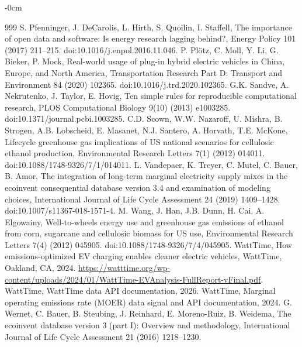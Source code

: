 \documentclass[cleantechnol,article,submit,pdftex,moreauthors]{Definitions/mdpi}
\begin{document}
\begin{adjustwidth}{-\extralength}{0cm}
\begin{thebibliography}{999}
S. Pfenninger, J. DeCarolis, L. Hirth, S. Quoilin, I. Staffell, The importance of open data and software: Is energy research lagging behind?, Energy Policy 101 (2017) 211--215. doi:10.1016/j.enpol.2016.11.046.
P. Plötz, C. Moll, Y. Li, G. Bieker, P. Mock, Real-world usage of plug-in hybrid electric vehicles in China, Europe, and North America, Transportation Research Part D: Transport and Environment 84 (2020) 102365. doi:10.1016/j.trd.2020.102365.
G.K. Sandve, A. Nekrutenko, J. Taylor, E. Hovig, Ten simple rules for reproducible computational research, PLOS Computational Biology 9(10) (2013) e1003285. doi:10.1371/journal.pcbi.1003285.
C.D. Scown, W.W. Nazaroff, U. Mishra, B. Strogen, A.B. Lobscheid, E. Masanet, N.J. Santero, A. Horvath, T.E. McKone, Lifecycle greenhouse gas implications of US national scenarios for cellulosic ethanol production, Environmental Research Letters 7(1) (2012) 014011. doi:10.1088/1748-9326/7/1/014011.
L. Vandepaer, K. Treyer, C. Mutel, C. Bauer, B. Amor, The integration of long-term marginal electricity supply mixes in the ecoinvent consequential database version 3.4 and examination of modeling choices, International Journal of Life Cycle Assessment 24 (2019) 1409--1428. doi:10.1007/s11367-018-1571-4.
M. Wang, J. Han, J.B. Dunn, H. Cai, A. Elgowainy, Well-to-wheels energy use and greenhouse gas emissions of ethanol from corn, sugarcane and cellulosic biomass for US use, Environmental Research Letters 7(4) (2012) 045905. doi:10.1088/1748-9326/7/4/045905.
WattTime, How emissions-optimized EV charging enables cleaner electric vehicles, WattTime, Oakland, CA, 2024. \url{https://watttime.org/wp-content/uploads/2024/01/WattTime-EVAnalysis-FullReport-vFinal.pdf}.
WattTime, WattTime data API documentation, 2026.
WattTime, Marginal operating emissions rate (MOER) data signal and API documentation, 2024.
G. Wernet, C. Bauer, B. Steubing, J. Reinhard, E. Moreno-Ruiz, B. Weidema, The ecoinvent database version 3 (part I): Overview and methodology, International Journal of Life Cycle Assessment 21 (2016) 1218--1230.
\end{thebibliography}

\PublishersNote{}
\end{adjustwidth}
\end{document}
